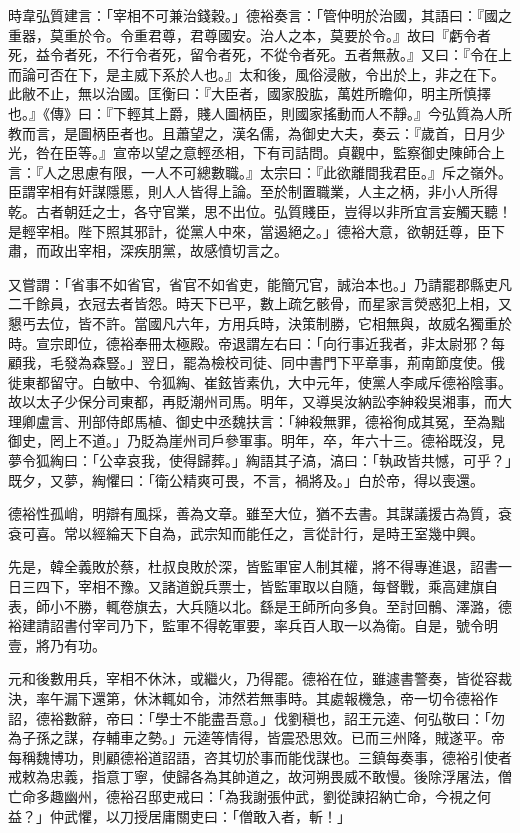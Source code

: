 \begin{pinyinscope}
 時韋弘質建言：「宰相不可兼治錢穀。」德裕奏言：「管仲明於治國，其語曰：『國之重器，莫重於令。令重君尊，君尊國安。治人之本，莫要於令。』故曰『虧令者死，益令者死，不行令者死，留令者死，不從令者死。五者無赦。』又曰：『令在上而論可否在下，是主威下系於人也。』太和後，風俗浸敝，令出於上，非之在下。此敝不止，無以治國。匡衡曰：『大臣者，國家股肱，萬姓所瞻仰，明主所慎擇也。』《傳》曰：『下輕其上爵，賤人圖柄臣，則國家搖動而人不靜。』今弘質為人所教而言，是圖柄臣者也。且蕭望之，漢名儒，為御史大夫，奏云：『歲首，日月少光，咎在臣等。』宣帝以望之意輕丞相，下有司詰問。貞觀中，監察御史陳師合上言：『人之思慮有限，一人不可總數職。』太宗曰：『此欲離間我君臣。』斥之嶺外。臣謂宰相有奸謀隱慝，則人人皆得上論。至於制置職業，人主之柄，非小人所得乾。古者朝廷之士，各守官業，思不出位。弘質賤臣，豈得以非所宜言妄觸天聽！是輕宰相。陛下照其邪計，從黨人中來，當遏絕之。」德裕大意，欲朝廷尊，臣下肅，而政出宰相，深疾朋黨，故感憤切言之。



 又嘗謂：「省事不如省官，省官不如省吏，能簡冗官，誠治本也。」乃請罷郡縣吏凡二千餘員，衣冠去者皆怨。時天下已平，數上疏乞骸骨，而星家言熒惑犯上相，又懇丐去位，皆不許。當國凡六年，方用兵時，決策制勝，它相無與，故威名獨重於時。宣宗即位，德裕奉冊太極殿。帝退謂左右曰：「向行事近我者，非太尉邪？每顧我，毛發為森豎。」翌日，罷為檢校司徒、同中書門下平章事，荊南節度使。俄徙東都留守。白敏中、令狐綯、崔鉉皆素仇，大中元年，使黨人李咸斥德裕陰事。故以太子少保分司東都，再貶潮州司馬。明年，又導吳汝納訟李紳殺吳湘事，而大理卿盧言、刑部侍郎馬植、御史中丞魏扶言：「紳殺無罪，德裕徇成其冤，至為黜御史，罔上不道。」乃貶為崖州司戶參軍事。明年，卒，年六十三。德裕既沒，見夢令狐綯曰：「公幸哀我，使得歸葬。」綯語其子滈，滈曰：「執政皆共憾，可乎？」既夕，又夢，綯懼曰：「衛公精爽可畏，不言，禍將及。」白於帝，得以喪還。



 德裕性孤峭，明辯有風採，善為文章。雖至大位，猶不去書。其謀議援古為質，袞袞可喜。常以經綸天下自為，武宗知而能任之，言從計行，是時王室幾中興。



 先是，韓全義敗於蔡，杜叔良敗於深，皆監軍宦人制其權，將不得專進退，詔書一日三四下，宰相不豫。又諸道銳兵票士，皆監軍取以自隨，每督戰，乘高建旗自表，師小不勝，輒卷旗去，大兵隨以北。繇是王師所向多負。至討回鶻、澤潞，德裕建請詔書付宰司乃下，監軍不得乾軍要，率兵百人取一以為衛。自是，號令明壹，將乃有功。



 元和後數用兵，宰相不休沐，或繼火，乃得罷。德裕在位，雖遽書警奏，皆從容裁決，率午漏下還第，休沐輒如令，沛然若無事時。其處報機急，帝一切令德裕作詔，德裕數辭，帝曰：「學士不能盡吾意。」伐劉稹也，詔王元逵、何弘敬曰：「勿為子孫之謀，存輔車之勢。」元逵等情得，皆震恐思效。已而三州降，賊遂平。帝每稱魏博功，則顧德裕道詔語，咨其切於事而能伐謀也。三鎮每奏事，德裕引使者戒敕為忠義，指意丁寧，使歸各為其帥道之，故河朔畏威不敢慢。後除浮屠法，僧亡命多趣幽州，德裕召邸吏戒曰：「為我謝張仲武，劉從諫招納亡命，今視之何益？」仲武懼，以刀授居庸關吏曰：「僧敢入者，斬！」




\end{pinyinscope}

